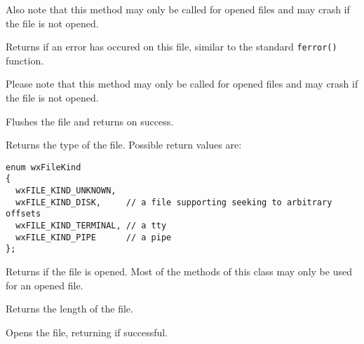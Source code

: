 Also note that this method may only be called for opened files and may crash if
the file is not opened.




\label{wxffileerror}

Returns \true if an error has occured on this file, similar to the standard
\texttt{ferror()} function.

Please note that this method may only be called for opened files and may crash
if the file is not opened.




\label{wxffileflush}


Flushes the file and returns \true on success.


\label{wxffilegetfilekind}


Returns the type of the file. Possible return values are:

\begin{verbatim}
enum wxFileKind
{
  wxFILE_KIND_UNKNOWN,
  wxFILE_KIND_DISK,     // a file supporting seeking to arbitrary offsets
  wxFILE_KIND_TERMINAL, // a tty
  wxFILE_KIND_PIPE      // a pipe
};

\end{verbatim}


\label{wxffileisopened}


Returns \true if the file is opened. Most of the methods of this class may only
be used for an opened file.


\label{wxffilelength}


Returns the length of the file.


\label{wxffileopen}


Opens the file, returning \true if successful.


